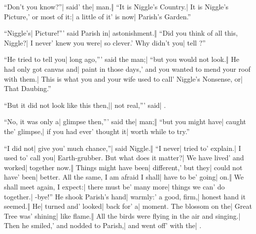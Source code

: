\begin{itemize}
\halfone “Don’t you know?”| said' the| man.‖ “It is Niggle’s Country.| It is Niggle’s Picture,' or most of it:| a little of it' is now| Parish’s Garden.”
\end{itemize}

\begin{itemize}
\halftwo “Niggle’s| Picture!”' said Parish in| astonishment.‖ “Did you think of all this, Niggle?| I never' knew you were| so clever.' Why didn’t you| tell ?”
\end{itemize}

\begin{itemize}
\halfone “He tried to tell you| long ago,”' said the man;| “but you would not look.‖ He had only got canvas and| paint in those days,' and you wanted to mend your roof with them.| This is what you and your wife used to call' Niggle’s Nonsense, or| That Daubing.”
\end{itemize}

\begin{itemize}
\quarterfour “But it did not look like this then,|| not real,”' said| .
\end{itemize}


\begin{itemize}
\halfone “No, it was only a| glimpse then,”' said the| man;‖ “but you might have| caught the' glimpse,| if you had ever' thought it| worth while to try.”
\end{itemize}

\begin{itemize}
\halftwo “I did not| give you' much chance,”| said Niggle.‖ “I never| tried to' explain.|\onlyscore{\linebreak} I used to' call you|  Earth-grubber.
\halfone {}But what does it matter?| We have lived' and worked| together now.‖ Things might have been| different,' but they| could not have' been| better.
\halftwo {}All the same, I am afraid I shall| have to be' going| on.‖ We shall meet again, I expect:| there must be' many more| things we can' do together.| -bye!”
\halfone He shook Parish’s hand| warmly:' a good, firm,| honest hand it seemed.‖ He| turned and' looked| back for' a| moment.
\halftwo The blossom on the| Great Tree was' shining| like flame.‖ All the birds were flying in the air and singing.| Then he smiled,' and nodded to Parish,| and went off' with the| .
\end{itemize}

